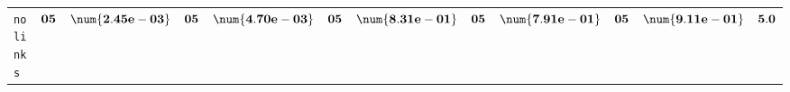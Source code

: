 \begin{xltabular}{\textwidth}{l||cC|cC|cC|cC|cC||c}
	\texttt{no links} & $\bf 05$ & $\bf \num{2.45e-03}$ & $\bf 05$ & $\bf \num{4.70e-03}$ & $\bf 05$ & $\bf \num{8.31e-01}$ & $\bf 05$ & $\bf \num{7.91e-01}$ & $\bf 05$ & $\bf \num{9.11e-01}$ & $\bf 5.0$  \\
\end{xltabular}
